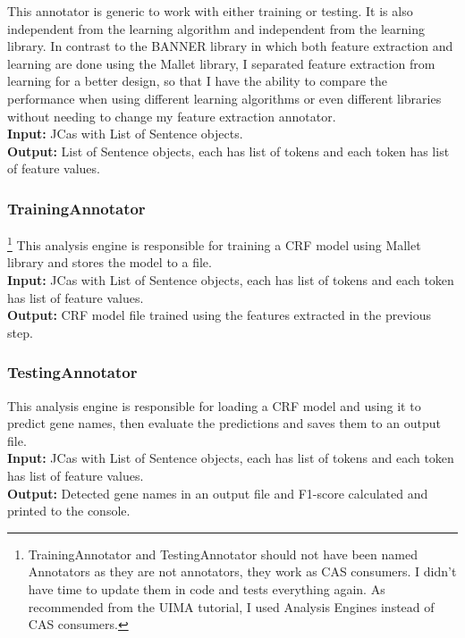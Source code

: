 \documentclass{article}
\begin{document}
This annotator is generic to work with either training or testing. It is also independent from the learning algorithm and independent from the learning library. In contrast to the BANNER library in which both feature extraction and learning are done using the Mallet library, I separated feature extraction from learning for a better design, so that I have the ability to compare the performance when using different learning algorithms or even different libraries without needing to change my feature extraction annotator.\\
\textbf{Input:} JCas with List of Sentence objects.\\
\textbf{Output:} List of Sentence objects, each has list of tokens and each token has list of feature values.\\




\subsubsection{TrainingAnnotator}
\footnote{TrainingAnnotator and TestingAnnotator should not have been named Annotators as they are not annotators, they work as CAS consumers. I didn't have time to update them in code and tests everything again. As recommended from the UIMA tutorial, I used Analysis Engines instead of CAS consumers.}
This analysis engine is responsible for training a CRF model using Mallet library and stores the model to a file.\\
\textbf{Input:} JCas with List of Sentence objects, each has list of tokens and each token has list of feature values.\\
\textbf{Output:} CRF model file trained using the features extracted in the previous step.\\

\subsubsection{TestingAnnotator}
 This analysis engine is responsible for loading a CRF model and using it to predict gene names, then evaluate the predictions and saves them to an output file.\\
\textbf{Input:} JCas with List of Sentence objects, each has list of tokens and each token has list of feature values.\\
\textbf{Output:} Detected gene names in an output file and F1-score calculated and printed to the console.\\
\end{document}
